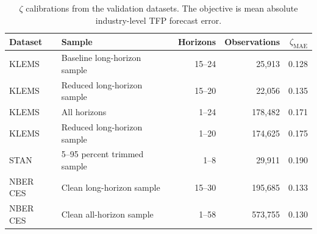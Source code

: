 \begin{table}[t]
\centering
\caption{$\zeta$ calibrations from the validation datasets. The objective is mean absolute industry-level TFP forecast error.} 
\label{tab:zeta_calibration_code}
\begin{tabular}{llrrr}
  \hline
Dataset & Sample & Horizons & Observations & $\zeta_{\mathrm{MAE}}$ \\ 
  \hline
KLEMS & Baseline long-horizon sample & 15--24 & 25,913 & 0.128 \\ 
  KLEMS & Reduced long-horizon sample & 15--20 & 22,056 & 0.135 \\ 
  KLEMS & All horizons & 1--24 & 178,482 & 0.171 \\ 
  KLEMS & Reduced long-horizon sample & 1--20 & 174,625 & 0.175 \\ 
  STAN & 5--95 percent trimmed sample & 1--8 & 29,911 & 0.190 \\ 
  NBER CES & Clean long-horizon sample & 15--30 & 195,685 & 0.133 \\ 
  NBER CES & Clean all-horizon sample & 1--58 & 573,755 & 0.130 \\ 
   \hline
\end{tabular}
\end{table}
